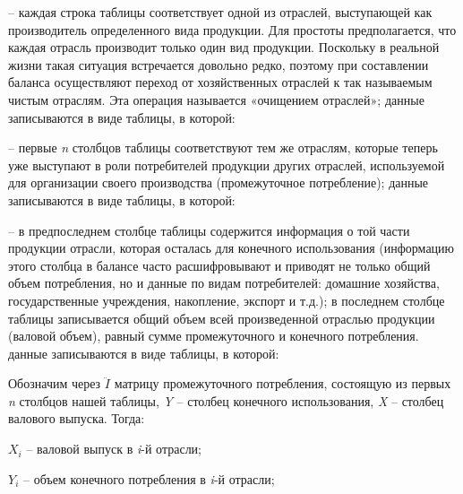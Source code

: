 \documentclass[12pt, 4paper]{book}
\begin{document}
{– каждая строка таблицы соответствует одной из отраслей, выступающей как производитель определенного вида продукции. Для простоты предполагается, что каждая отрасль производит только один вид продукции. Поскольку в реальной жизни такая ситуация встречается довольно редко, поэтому при составлении баланса осуществляют переход от хозяйственных отраслей к так называемым чистым отраслям. Эта операция называется «очищением отраслей»;
данные записываются в виде таблицы, в которой:
\par

– первые \textit{n} столбцов таблицы соответствуют тем же отраслям, которые теперь уже выступают в роли потребителей продукции других отраслей, используемой для организации своего производства (промежуточное потребление);
данные записываются в виде таблицы, в которой:
\par

– в предпоследнем столбце таблицы содержится информация о той части продукции отрасли, которая осталась для конечного использования (информацию этого столбца в балансе часто расшифровывают и приводят не только общий объем потребления, но и данные по видам потребителей: домашние хозяйства, государственные учреждения, накопление, экспорт и т.д.);
в последнем столбце таблицы записывается общий объем всей произведенной отраслью продукции (валовой объем), равный сумме промежуточного и конечного потребления.
данные записываются в виде таблицы, в которой:
\par

Обозначим через $\ddot{I}$ матрицу промежуточного потребления, состоящую из первых \textit{n} столбцов нашей  таблицы, \textit{Y} – столбец конечного использования, \textit{X} – столбец валового выпуска. Тогда:
\par

$X_i$ – валовой выпуск в \textit{i}-й отрасли;
\par

$Y_i$ – объем конечного потребления в \textit{i}-й отрасли;
\par

}
\end{document}
